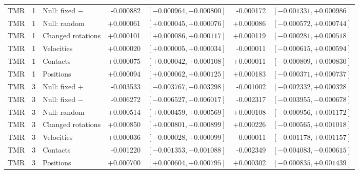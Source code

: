 \begin{table}[t]
\begin{tabular}{@{}rllrrrr@{}}
TMR&1&Null: fixed $-$&-0.000882&$[-0.000964,-0.000800]$&-0.000172&$[-0.001331,+0.000986]$\\
TMR&1&Null: random&+0.000061&$[+0.000045,+0.000076]$&+0.000086&$[-0.000572,+0.000744]$\\
TMR&1&Changed rotations&+0.000101&$[+0.000086,+0.000117]$&+0.000119&$[-0.000281,+0.000518]$\\
TMR&1&Velocities&+0.000020&$[+0.000005,+0.000034]$&-0.000011&$[-0.000615,+0.000594]$\\
TMR&1&Contacts&+0.000075&$[+0.000042,+0.000108]$&+0.000011&$[-0.000809,+0.000830]$\\
TMR&1&Positions&+0.000094&$[+0.000062,+0.000125]$&+0.000183&$[-0.000371,+0.000737]$\\
TMR&3&Null: fixed +&-0.003533&$[-0.003767,-0.003298]$&-0.001002&$[-0.002332,+0.000328]$\\
TMR&3&Null: fixed $-$&-0.006272&$[-0.006527,-0.006017]$&-0.002317&$[-0.003955,-0.000678]$\\
TMR&3&Null: random&+0.000514&$[+0.000459,+0.000569]$&+0.000108&$[-0.000956,+0.001172]$\\
TMR&3&Changed rotations&+0.000850&$[+0.000801,+0.000899]$&+0.000226&$[-0.000565,+0.001018]$\\
TMR&3&Velocities&+0.000036&$[-0.000028,+0.000099]$&-0.000011&$[-0.001178,+0.001157]$\\
TMR&3&Contacts&-0.001220&$[-0.001353,-0.001088]$&-0.002349&$[-0.004083,-0.000615]$\\
TMR&3&Positions&+0.000700&$[+0.000604,+0.000795]$&+0.000302&$[-0.000835,+0.001439]$\\
\bottomrule\end{tabular}\end{table}
